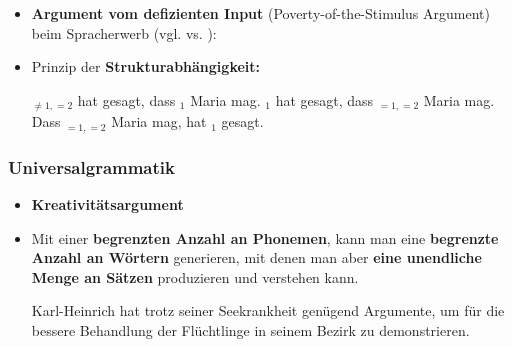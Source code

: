 \begin{frame}

\begin{itemize}
	\item \textbf{Argument vom defizienten Input} (Poverty-of-the-Stimulus Argument) beim Spracherwerb (vgl. \citealt{Lasnik&Co02a} vs. \citealt{Pullum&Scholz02a}):
	\medskip
	\item Prinzip der \textbf{Strukturabhängigkeit:}
	\eal 
\pause
\pause
\pause	
\pause
	\zl

\pause	

	\eal 
	\ex {}$_{\neq 1, =2}$ hat gesagt, dass $_1$ Maria mag.
\pause	
	\ex {}$_1$ hat gesagt, dass $_{=1, =2}$ Maria mag.
\pause	
	\ex Dass $_{=1, =2}$ Maria mag, hat $_1$ gesagt.
	\zl
	
	
\end{itemize}

\end{frame}


\begin{frame}
\frametitle{Universalgrammatik}

\begin{itemize}
	\item \textbf{Kreativitätsargument}
	\medskip
	\item Mit einer \textbf{begrenzten Anzahl an Phonemen}, kann man eine \textbf{begrenzte Anzahl an Wörtern} generieren, mit denen man aber \textbf{eine unendliche Menge an Sätzen} produzieren und verstehen kann.

\pause	
	\ea Karl-Heinrich hat trotz seiner Seekrankheit genügend Argumente, um für die bessere Behandlung der Flüchtlinge in seinem Bezirk zu demonstrieren.
	\z

\end{itemize}

\end{frame}


